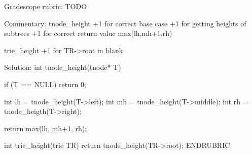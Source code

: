 \begin{parts}
Gradescope rubric:  TODO

Commentary:
  tnode_height
      +1 for correct base case
      +1 for getting heights of subtrees
      +1 for correct return value max(lh,mh+1,rh)

  trie_height
      +1 for TR->root in blank

Solution:
int tnode_height(tnode* T) {
  if (T == NULL) return 0;

  int lh = tnode_height(T->left);
  int mh = tnode_height(T->middle);
  int rh = tnode_heigth(T->right);

  return max(lh, mh+1, rh);
}

int trie_height(trie TR) {
  return tnode_height(TR->root);
}
ENDRUBRIC


\end{parts}
